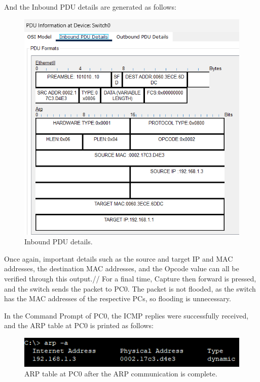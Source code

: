 \documentclass[a4paper,12pt]{article}
\begin{document}
And the Inbound PDU details are generated as follows:
\begin{figure}[H]
\centering
\includegraphics[width=\linewidth,keepaspectratio]{Pictures_Lab1/inbound pdu obj6.10.png}
\caption{Inbound PDU details.}
\end{figure}

Once again, important details such as the source and target IP and MAC addresses, the destination MAC addresses, and the Opcode value can all be verified through this output.//
For a final time, Capture then forward is pressed, and the switch sends the packet to PC0. The packet is not flooded, as the switch has the MAC addresses of the respective PCs, so flooding is unnecessary.

In the Command Prompt of PC0, the ICMP replies were successfully received, and the ARP table at PC0 is printed as follows:
\begin{figure}[H]
\centering
\includegraphics[width=\linewidth,keepaspectratio]{Pictures_Lab1/arp -a final .png}
\caption{ARP table at PC0 after the ARP communication is complete.}
\end{figure}
\end{document}
